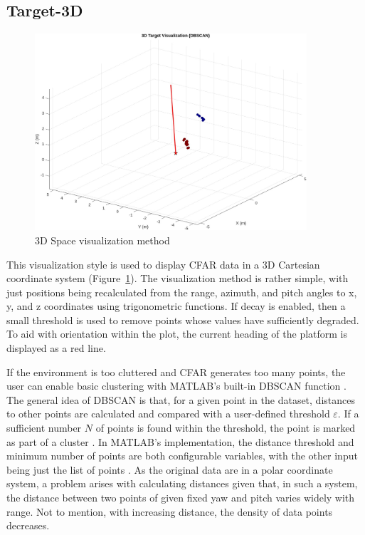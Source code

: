 \subsection{Target-3D}

\begin{figure}[h!]
	\centering
	\includegraphics[width=0.9\textwidth]{../img/vis_3d.jpg}
	\caption[3D Space visualization method]{3D Space visualization method}
	\label{fig:vis3d}
\end{figure}

This visualization style is used to display CFAR data in a 3D Cartesian coordinate system (Figure~\ref{fig:vis3d}).
The visualization method is rather simple, with just positions being recalculated from the range, azimuth, and pitch angles to x, y, and z coordinates using trigonometric functions.
If decay is enabled, then a small threshold is used to remove points whose values have sufficiently degraded.
To aid with orientation within the plot, the current heading of the platform is displayed as a red line.

If the environment is too cluttered and CFAR generates too many points, the user can enable basic clustering with MATLAB's built-in DBSCAN function \cite{matlab_dbscan}.
The general idea of DBSCAN is that, for a given point in the dataset, distances to other points are calculated and compared with a user-defined threshold $\varepsilon$.
If a sufficient number $N$ of points is found within the threshold, the point is marked as part of a cluster \cite{Kellner2012}.
In MATLAB's implementation, the distance threshold and minimum number of points are both configurable variables, with the other input being just the list of points \cite{matlab_dbscan}.
As the original data are in a polar coordinate system, a problem arises with calculating distances given that, in such a system, the distance between two points of given fixed yaw and pitch varies widely with range.
Not to mention, with increasing distance, the density of data points decreases.

